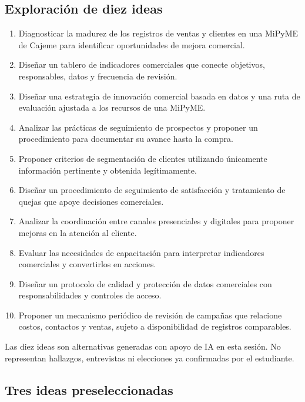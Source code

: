 \documentclass[
  spanish,
  11pt,
]{article}
\providecommand{\tightlist}{%
  \setlength{\itemsep}{0pt}\setlength{\parskip}{0pt}}
\begin{document}
\subsection{Exploración de diez
ideas}\label{exploraciuxf3n-de-diez-ideas}

\begin{enumerate}
\def\labelenumi{\arabic{enumi}.}
\tightlist
\item
  Diagnosticar la madurez de los registros de ventas y clientes en una
  MiPyME de Cajeme para identificar oportunidades de mejora comercial.
\item
  Diseñar un tablero de indicadores comerciales que conecte objetivos,
  responsables, datos y frecuencia de revisión.
\item
  Diseñar una estrategia de innovación comercial basada en datos y una
  ruta de evaluación ajustada a los recursos de una MiPyME.
\item
  Analizar las prácticas de seguimiento de prospectos y proponer un
  procedimiento para documentar su avance hasta la compra.
\item
  Proponer criterios de segmentación de clientes utilizando únicamente
  información pertinente y obtenida legítimamente.
\item
  Diseñar un procedimiento de seguimiento de satisfacción y tratamiento
  de quejas que apoye decisiones comerciales.
\item
  Analizar la coordinación entre canales presenciales y digitales para
  proponer mejoras en la atención al cliente.
\item
  Evaluar las necesidades de capacitación para interpretar indicadores
  comerciales y convertirlos en acciones.
\item
  Diseñar un protocolo de calidad y protección de datos comerciales con
  responsabilidades y controles de acceso.
\item
  Proponer un mecanismo periódico de revisión de campañas que relacione
  costos, contactos y ventas, sujeto a disponibilidad de registros
  comparables.
\end{enumerate}

Las diez ideas son alternativas generadas con apoyo de IA en esta
sesión. No representan hallazgos, entrevistas ni elecciones ya
confirmadas por el estudiante.

\subsection{Tres ideas
preseleccionadas}\label{tres-ideas-preseleccionadas}
\end{document}
